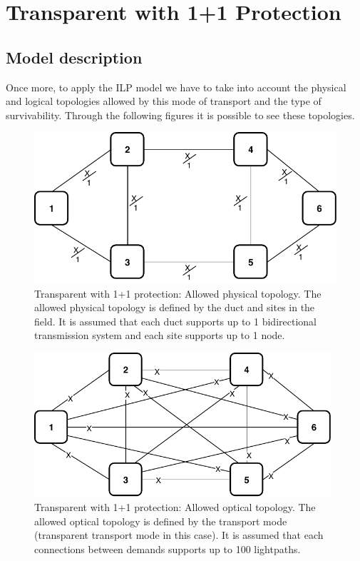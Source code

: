 \clearpage

\section{Transparent with 1+1 Protection}\label{ILP_Transp_Protection}

\subsection{Model description}

Once more, to apply the ILP model we have to take into account the physical and logical topologies allowed by this mode of transport and the type of survivability. Through the following figures it is possible to see these topologies.\\

\begin{figure}[h!]
\centering
\includegraphics[width=12cm]{sdf/ilp/transparent_protection/figures/allowed_physical_topology}
\caption{Transparent with 1+1 protection: Allowed physical topology. The allowed physical topology is defined by the duct and sites in the field. It is assumed that each duct supports up to 1 bidirectional transmission system and each site supports up to 1 node.}
\label{allowed2_physical_protectionlow}
\end{figure}

\vspace{15pt}
\begin{figure}[h!]
\centering
\includegraphics[width=11cm]{sdf/ilp/transparent_protection/figures/allowed_optical_topology}
\caption{Transparent with 1+1 protection: Allowed optical topology. The allowed optical topology is defined by the transport mode (transparent transport mode in this case). It is assumed that each connections between demands supports up to 100 lightpaths.}
\label{allowed2_optical_protectionlow}
\end{figure}

